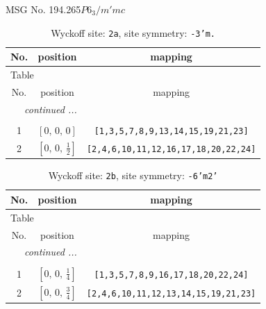 \documentclass[fleqn,8pt]{jsarticle}
\begin{document}
\setcounter{MaxMatrixCols}{32}

\renewcommand{\tablename}{Table~}
\renewcommand{\figurename}{Figure~}
\begin{center}
\LARGE
MSG No. 194.265\quad$P6_{3}/m'mc$
\end{center}
\renewcommand{\arraystretch}{1.2}
\begin{longtable}{ccc}
\caption{Wyckoff site: {\tt 2a}, site symmetry: {\tt -3'm.}}
 \\
 \hline \hline
No. & position & mapping \\ \hline \endfirsthead

\multicolumn{2}{l}{\tablename\ \thetable{}} \\
 \hline \hline
No. & position & mapping \\ \hline \endhead

 \hline \hline
\multicolumn{2}{r}{\footnotesize\it continued ...} \\ \endfoot

 \hline \hline
\multicolumn{2}{r}{} \\ \endlastfoot

1 & $\left[ 0,\, 0,\, 0 \right]$ & {\tt [1,3,5,7,8,9,13,14,15,19,21,23]} \\ \hline
2 & $\left[ 0,\, 0,\, \frac{1}{2} \right]$ & {\tt [2,4,6,10,11,12,16,17,18,20,22,24]} \\
\end{longtable}
\renewcommand{\arraystretch}{1.2}
\begin{longtable}{ccc}
\caption{Wyckoff site: {\tt 2b}, site symmetry: {\tt -6'm2'}}
 \\
 \hline \hline
No. & position & mapping \\ \hline \endfirsthead

\multicolumn{2}{l}{\tablename\ \thetable{}} \\
 \hline \hline
No. & position & mapping \\ \hline \endhead

 \hline \hline
\multicolumn{2}{r}{\footnotesize\it continued ...} \\ \endfoot

 \hline \hline
\multicolumn{2}{r}{} \\ \endlastfoot

1 & $\left[ 0,\, 0,\, \frac{1}{4} \right]$ & {\tt [1,3,5,7,8,9,16,17,18,20,22,24]} \\ \hline
2 & $\left[ 0,\, 0,\, \frac{3}{4} \right]$ & {\tt [2,4,6,10,11,12,13,14,15,19,21,23]} \\
\end{longtable}
\end{document}
